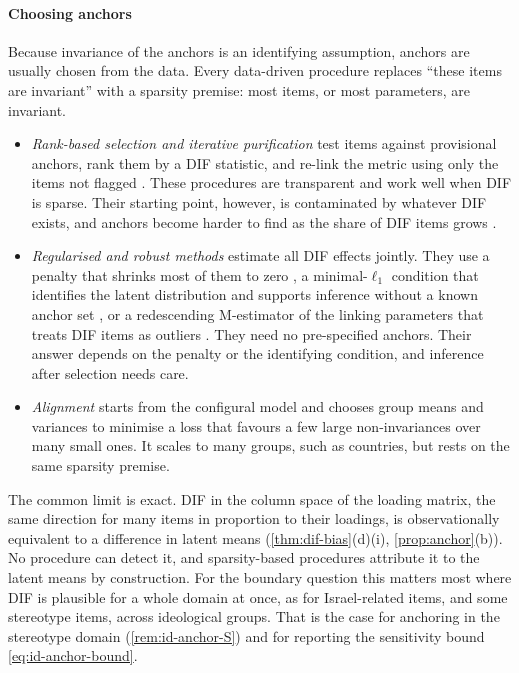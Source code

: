 \paragraph{Choosing anchors}
\begin{remark}\label{rem:id-anchor-select}
Because invariance of the anchors is an identifying assumption, anchors are usually chosen from the data. Every data-driven procedure replaces ``these items are invariant'' with a sparsity premise: most items, or most parameters, are invariant.
\begin{itemize}
  \item \emph{Rank-based selection and iterative purification} test items against provisional anchors, rank them by a DIF statistic, and re-link the metric using only the items not flagged \citep{lord1980,candell1988,woods2009,kopf2015}. These procedures are transparent and work well when DIF is sparse. Their starting point, however, is contaminated by whatever DIF exists, and anchors become harder to find as the share of DIF items grows \citep{woods2009,kopf2015}.
  \item \emph{Regularised and robust methods} estimate all DIF effects jointly. They use a penalty that shrinks most of them to zero \citep{tutz2015,belzak2020}, a minimal-$\ell_1$ condition that identifies the latent distribution and supports inference without a known anchor set \citep{chen2023dif}, or a redescending M-estimator of the linking parameters that treats DIF items as outliers \citep{halpin2024}. They need no pre-specified anchors. Their answer depends on the penalty or the identifying condition, and inference after selection needs care.
  \item \emph{Alignment} \citep{asparouhov2014} starts from the configural model and chooses group means and variances to minimise a loss that favours a few large non-invariances over many small ones. It scales to many groups, such as countries, but rests on the same sparsity premise.
\end{itemize}
The common limit is exact. DIF in the column space of the loading matrix, the same direction for many items in proportion to their loadings, is observationally equivalent to a difference in latent means (\cref{thm:dif-bias}(d)(i), \cref{prop:anchor}(b)). No procedure can detect it, and sparsity-based procedures attribute it to the latent means by construction. For the boundary question this matters most where DIF is plausible for a whole domain at once, as for Israel-related items, and some stereotype items, across ideological groups. That is the case for anchoring in the stereotype domain (\cref{rem:id-anchor-S}) and for reporting the sensitivity bound \eqref{eq:id-anchor-bound}.
\end{remark}

